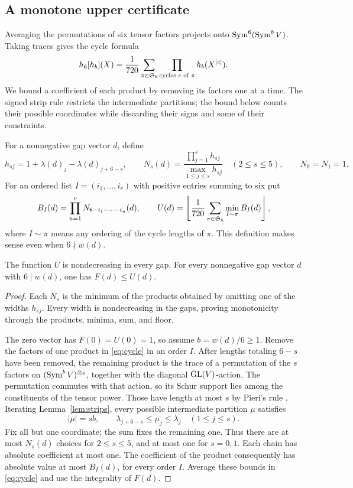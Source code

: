 \subsection{A monotone upper certificate}
Averaging the permutations of six tensor factors projects onto
\(\operatorname{Sym}^6(\operatorname{Sym}^b V)\). Taking traces gives the cycle formula
\begin{equation}\label{eq:cycle}
        h_6[h_b](X)=\frac1{720}\sum_{\pi\in\mathfrak S_6}
                   \prod_{\text{cycles }c\text{ of }\pi}h_b(X^{|c|}).
\end{equation}
We bound a coefficient of each product by removing its factors one at
a time. The signed strip rule restricts the intermediate partitions;
the bound below counts their possible coordinates while discarding
their signs and some of their constraints.

For a nonnegative gap vector \(d\), define
\[
 h_{sj}=1+\lambda(d)_j-\lambda(d)_{j+6-s},\qquad
 N_s(d)=\frac{\prod_{j=1}^s h_{sj}}{\max_{1\le j\le s}h_{sj}}
            \quad(2\le s\le5),\qquad N_0=N_1=1.
\]
For an ordered list \(I=(i_1,\ldots,i_v)\) with positive entries summing
to six put
\[
 B_I(d)=\prod_{u=1}^v N_{6-i_1-\cdots-i_u}(d),\qquad
 U(d)=\left\lfloor\frac1{720}
       \sum_{\pi\in\mathfrak S_6}\min_{I\sim\pi}B_I(d)\right\rfloor ,
\]
where \(I\sim\pi\) means any ordering of the cycle lengths of \(\pi\).
This definition makes sense even when \(6\nmid w(d)\).

\begin{proposition}\label{prop:upper}
The function \(U\) is nondecreasing in every gap. For every nonnegative
gap vector \(d\) with \(6\mid w(d)\), one has \(F(d)\le U(d)\).
\end{proposition}
\begin{proof}
Each \(N_s\) is the minimum of the products obtained by omitting one of
the widths \(h_{sj}\). Every width is nondecreasing in the gaps, proving
monotonicity through the products, minima, sum, and floor.

The zero vector has \(F(0)=U(0)=1\), so assume \(b=w(d)/6\ge1\).
Remove the factors of one product in \eqref{eq:cycle} in an order \(I\).
After lengths totaling \(6-s\) have been removed, the remaining product
is the trace of a permutation of the \(s\) factors on
\((\operatorname{Sym}^b V)^{\otimes s}\), together with the diagonal \(\operatorname{GL}(V)\)-action.
The permutation commutes with that action, so its Schur support lies
among the constituents of the tensor power. Those have length at most
\(s\) by Pieri's rule
\cite[Chapter~I, equation~(5.16)]{Macdonald1995}.
Iterating Lemma~\ref{lem:strips}, every possible intermediate
partition \(\mu\) satisfies
\[
       |\mu|=sb,\qquad
       \lambda_{j+6-s}\le\mu_j\le\lambda_j\quad(1\le j\le s).
\]
Fix all but one coordinate; the sum fixes the remaining one.
Thus there are at most \(N_s(d)\) choices for \(2\le s\le5\), and at most
one for \(s=0,1\). Each chain has absolute coefficient at most one.
The coefficient of the product consequently has absolute value at most
\(B_I(d)\), for every order \(I\). Average these bounds in
\eqref{eq:cycle} and use the integrality of \(F(d)\).
\end{proof}


